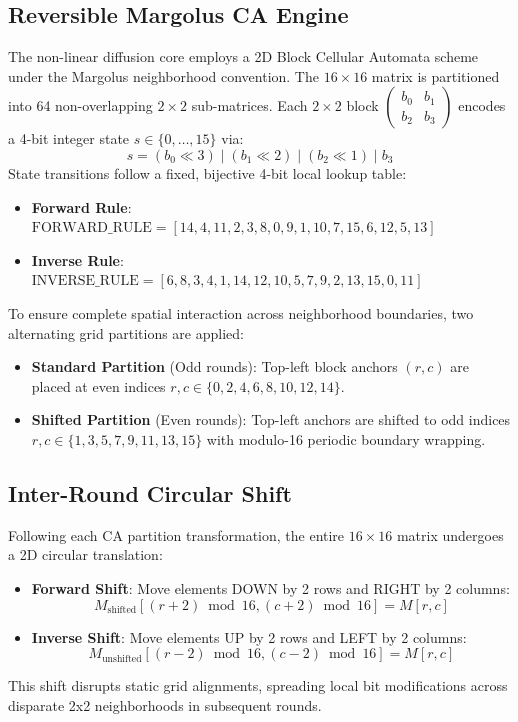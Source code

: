 \subsection{Reversible Margolus CA Engine}
\label{subsec:margolus_engine}
The non-linear diffusion core employs a 2D Block Cellular Automata scheme under the Margolus neighborhood convention. The $16 \times 16$ matrix is partitioned into 64 non-overlapping $2 \times 2$ sub-matrices. Each $2 \times 2$ block $\begin{pmatrix} b_0 & b_1 \\ b_2 & b_3 \end{pmatrix}$ encodes a 4-bit integer state $s \in \{0, \dots, 15\}$ via:
\begin{equation}
s = (b_0 \ll 3) \mid (b_1 \ll 2) \mid (b_2 \ll 1) \mid b_3
\end{equation}
State transitions follow a fixed, bijective 4-bit local lookup table:
\begin{itemize}
    \item \textbf{Forward Rule}: $\text{FORWARD\_RULE} = [14, 4, 11, 2, 3, 8, 0, 9, 1, 10, 7, 15, 6, 12, 5, 13]$
    \item \textbf{Inverse Rule}: $\text{INVERSE\_RULE} = [6, 8, 3, 4, 1, 14, 12, 10, 5, 7, 9, 2, 13, 15, 0, 11]$
\end{itemize}
To ensure complete spatial interaction across neighborhood boundaries, two alternating grid partitions are applied:
\begin{itemize}
    \item \textbf{Standard Partition} (Odd rounds): Top-left block anchors $(r, c)$ are placed at even indices $r, c \in \{0, 2, 4, 6, 8, 10, 12, 14\}$.
    \item \textbf{Shifted Partition} (Even rounds): Top-left anchors are shifted to odd indices $r, c \in \{1, 3, 5, 7, 9, 11, 13, 15\}$ with modulo-16 periodic boundary wrapping.
\end{itemize}

\subsection{Inter-Round Circular Shift}
\label{subsec:circular_shift}
Following each CA partition transformation, the entire $16 \times 16$ matrix undergoes a 2D circular translation:
\begin{itemize}
    \item \textbf{Forward Shift}: Move elements DOWN by 2 rows and RIGHT by 2 columns:
    \begin{equation}
    M_{\text{shifted}}[(r + 2) \bmod 16, (c + 2) \bmod 16] = M[r, c]
    \end{equation}
    \item \textbf{Inverse Shift}: Move elements UP by 2 rows and LEFT by 2 columns:
    \begin{equation}
    M_{\text{unshifted}}[(r - 2) \bmod 16, (c - 2) \bmod 16] = M[r, c]
    \end{equation}
\end{itemize}
This shift disrupts static grid alignments, spreading local bit modifications across disparate 2x2 neighborhoods in subsequent rounds.

